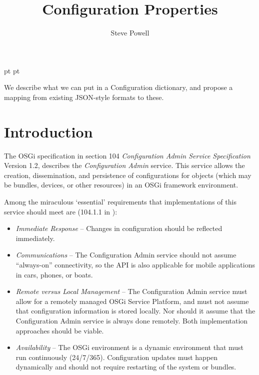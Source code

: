 \documentclass[a4paper,twoside,12pt]{article}
\begin{document}
 pt
 pt

\title{Configuration Properties}
\author{Steve Powell}
\maketitle
\thispagestyle{myheadings}
\setcounter{page}{0}

We describe what we can put in a Configuration dictionary, and propose a mapping from existing JSON-style formats to these.


\newcommand{\felix}{$f$eL$\iota\chi$}
\newcommand{\true}{true}
\newcommand{\false}{false}
\renewcommand{\emptyset}{\varnothing}

\clearpage
\tableofcontents

\clearpage
{}

\section{Introduction}
The OSGi specification \cite{OSGi} in section 104 {\it Configuration Admin Service Specification} Version 1.2, describes the \emph{Configuration Admin} service. This service allows the creation, dissemination, and persistence of configurations for objects (which may be bundles, devices, or other resources) in an OSGi framework environment.

Among the miraculous `essential' requirements that implementations of this service should meet are (104.1.1 in \cite{OSGi}):
\begin{itemize}
\item \emph{Immediate Response} -- Changes in configuration should be reflected immediately.
\item \emph{Communications} -- The Configuration Admin service should not assume ``always-on'' connectivity, so the API is also applicable for mobile applications in cars, phones, or boats.
\item \emph{Remote versus Local Management} -- The Configuration Admin service must 
allow for a remotely managed OSGi Service Platform, and must not 
assume that configuration information is stored locally. Nor should it 
assume that the Configuration Admin service is always done remotely. 
Both implementation approaches should be viable.
\item \emph{Availability} -- The OSGi environment is a dynamic environment that 
must run continuously (24/7/365). Configuration updates must happen 
dynamically and should not require restarting of the system or bundles.
\end{itemize}
\end{document}
